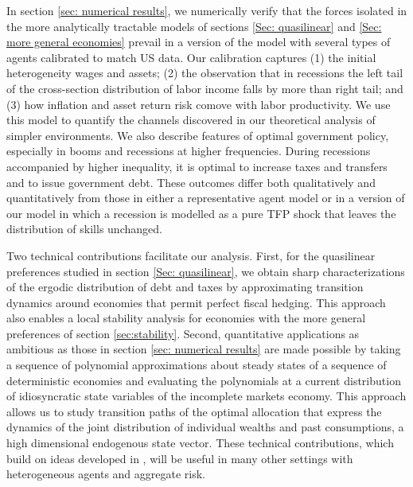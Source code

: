 \documentclass[thmsb,11pt]{article}
\begin{document}
In section \ref{sec: numerical results},
we numerically verify that the forces isolated in the more analytically tractable  models of sections \ref{Sec: quasilinear}
  and \ref{Sec: more general economies} prevail in  a version of the model with several types of agents  calibrated to match US data.
Our calibration captures (1) the initial heterogeneity wages and assets;
(2) the observation  that  in recessions the left tail of the cross-section distribution of labor income falls by more than right tail; and (3) how inflation and asset return risk comove with labor productivity. 
We use this model to quantify  the channels discovered  in our theoretical analysis of simpler environments. 
We also describe features of optimal government policy, especially in booms and recessions at higher frequencies.
During recessions accompanied by higher inequality, it is  optimal to increase taxes and transfers and to issue
government debt. %
These outcomes differ both qualitatively and quantitatively from those in either a representative agent model or in a version
of our model in which a  recession is modelled as a pure TFP shock that leaves the distribution of skills unchanged.


Two technical contributions facilitate our analysis. First, for the quasilinear preferences studied in section \ref{Sec: quasilinear}, 
we obtain sharp characterizations of the ergodic distribution of debt and taxes by approximating transition dynamics around economies that
permit perfect fiscal hedging. This approach also enables a local stability analysis for economies with the more general
preferences of section \ref{sec:stability}. Second, quantitative applications as ambitious as those in section \ref{sec: numerical results}
are made possible by taking a sequence of polynomial approximations about steady states of a sequence of deterministic economies and evaluating the
polynomials at a current distribution of idiosyncratic state variables of the incomplete markets economy. This approach allows us to study transition paths of the optimal allocation
that express the dynamics of the joint distribution of individual wealths and past consumptions, a high dimensional
endogenous state vector. These technical contributions, which build on ideas developed in \cite{Evans2014}, will be useful in many other settings 
with heterogeneous agents and aggregate risk. 
\end{document}
